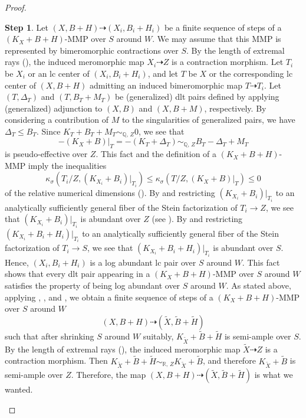 \documentclass[12pt]{amsart}
\theoremstyle{definition}
\newtheorem{step3}{Step}
\begin{document}
\begin{proof}
\begin{step3}
Let $(X,B+H) \dashrightarrow (X_{i},B_{i}+H_{i})$ be a finite sequence of steps of a $(K_{X}+B+H)$-MMP over $S$ around $W$. 
We may assume that this MMP is represented by bimeromorphic contractions over $S$. 
By the length of extremal rays (\cite[Theorem 1.1.6 (5)]{fujino-analytic-conethm}), the induced meromorphic map $X_{i} \dashrightarrow Z$ is a contraction morphism. 
Let $T_{i}$ be $X_{i}$ or an lc center of $(X_{i},B_{i}+H_{i})$, and let $T$ be $X$ or the corresponding lc center of $(X,B+H)$ admitting an induced bimeromorphic map $T \dashrightarrow T_{i}$. 
Let $(T,\Delta_{T})$ and $(T,B_{T}+M_{T})$ be (generalized) dlt pairs defined by applying (generalized) adjunction to $(X, B)$ and $(X,B+M)$, respectively.  
By considering a contribution of $M$ to the singularities of generalized pairs, we have $\Delta_{T}\leq B_{T}$. 
Since $K_{T}+B_{T}+M_{T} \sim_{\mathbb{Q},\,Z}0$, we see that 
$$-(K_{X}+B)|_{T}=-(K_{T}+\Delta_{T})\sim_{\mathbb{Q},\,Z}B_{T}-\Delta_{T}+M_{T}$$
is pseudo-effective over $Z$.
This fact and the definition of a $(K_{X}+B+H)$-MMP imply the inequalities
$$\kappa_{\sigma}(T_{i}/Z, (K_{X_{i}}+B_{i})|_{T_{i}}) \leq \kappa_{\sigma}(T/Z, (K_{X}+B)|_{T}) \leq 0$$
of the relative numerical dimensions (\cite[Definition 2.22]{eh-analytic-mmp}). 
By \cite{gongyo1} and restricting $(K_{X_{i}}+B_{i})|_{T_{i}}$ to an analytically sufficiently general fiber of the Stein factorization of $T_{i} \to Z$, we see that $(K_{X_{i}}+B_{i})|_{T_{i}}$ is abundant over $Z$ (see \cite[Definition 2.23]{eh-analytic-mmp}). 
By \cite[Lemma 2.19]{has-finite} and restricting $(K_{X_{i}}+B_{i}+H_{i})|_{T_{i}}$ to an analytically sufficiently general fiber of the Stein factorization of $T_{i} \to S$, we see that $(K_{X_{i}}+B_{i}+H_{i})|_{T_{i}}$ is abundant over $S$. 
Hence, $(X_{i},B_{i}+H_{i})$ is a log abundant lc pair over $S$ around $W$. 
This fact shows that every dlt pair appearing in a $(K_{X}+B+H)$-MMP over $S$ around $W$ satisfies the property of being log abundant over $S$ around $W$. 
As stated above, applying \cite[Theorem 1.3]{eh-analytic-mmp}, \cite[Theorem 1.5]{fujino-analytic-lcabundance}, and \cite[Theorem 1.1]{eh-analytic-mmp-2}, we obtain a finite sequence of steps of a $(K_{X}+B+H)$-MMP over $S$ around $W$%
$$(X,B+H) \dashrightarrow (\tilde{X},\tilde{B}+\tilde{H})$$
such that after shrinking $S$ around $W$ suitably, $K_{\tilde{X}}+\tilde{B}+\tilde{H}$ is semi-ample over $S$. 
By the length of extremal rays (\cite[Theorem 1.1.6 (5)]{fujino-analytic-conethm}), the induced meromorphic map $\tilde{X} \dashrightarrow Z$ is a contraction morphism. 
Then $K_{\tilde{X}}+\tilde{B}+\tilde{H} \sim_{\mathbb{R},\,Z}K_{\tilde{X}}+\tilde{B}$, and therefore $K_{\tilde{X}}+\tilde{B}$ is semi-ample over $Z$. 
Therefore, the map $(X,B+H) \dashrightarrow (\tilde{X},\tilde{B}+\tilde{H})$ is what we wanted. 


\end{step3}
\end{proof}
\end{document}
